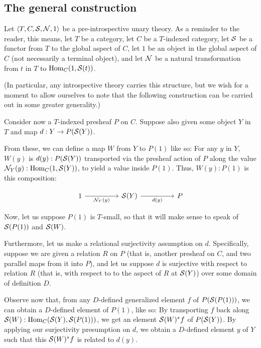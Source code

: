 \subsection{The general construction}
\label{GeneralDiag}
Let $\langle T, C, \mathcal{S}, \mathcal{N}, 1 \rangle$ be a pre-introspective unary theory. As a reminder to the reader, this means, let $T$ be a category, let $C$ be a $T$-indexed category, let $\mathcal{S}$ be a functor from $T$ to the global aspect of $C$, let $1$ be an object in the global aspect of $C$ (not necessarily a terminal object), and let $\mathcal{N}$ be a natural transformation from $t$ in $T$ to $\operatorname{Hom}_C(1, \mathcal{S}(t))$.

(In particular, any introspective theory carries this structure, but we wish for a moment to allow ourselves to note that the following construction can be carried out in some greater generality.)

Consider now a $T$-indexed presheaf $P$ on $C$. Suppose also given some object $Y$ in $T$ and map $d : Y \to P(\mathcal{S}(Y))$.

From these, we can define a map $W$ from $Y$ to $P(1)$ like so: For any $y$ in $Y$, $W(y)$ is $d(y) : P(\mathcal{S}(Y))$ transported via the presheaf action of $P$ along the value $\mathcal{N}_Y(y) : \operatorname{Hom}_C(1, \mathcal{S}(Y))$, to yield a value inside $P(1)$. Thus, $W(y) : P(1)$ is this composition:

\[\begin{tikzcd}
	1 && {\introS(Y)} && P
	\arrow["{d(y)}"', from=1-3, to=1-5]
	\arrow["{\introN_Y(y)}"', from=1-1, to=1-3]
\end{tikzcd}\]

Now, let us suppose $P(1)$ is $T$-small, so that it will make sense to speak of $\mathcal{S}(P(1))$ and $\mathcal{S}(W)$.

Furthermore, let us make a relational surjectivity assumption on $d$. Specifically, suppose we are given a relation $R$ on $P$ (that is, another presheaf on $C$, and two parallel maps from it into $P$), and let us suppose $d$ is surjective with respect to relation $R$ (that is, with respect to to the aspect of $R$ at $\mathcal{S}(Y)$) over some domain of definition $D$.

Observe now that, from any $D$-defined generalized element $f$ of $P(\mathcal{S}(P(1)))$, we can obtain a $D$-defined element of $P(1)$, like so: By transporting $f$ back along $\mathcal{S}(W) : \operatorname{Hom}_C(\mathcal{S}(Y), \mathcal{S}(P(1)))$, we get an element $\mathcal{S}(W)^*f$ of $P(\mathcal{S}(Y))$. By applying our surjectivity presumption on $d$, we obtain a $D$-defined element $y$ of $Y$ such that this $\mathcal{S}(W)^*f$ is related to $d(y)$.

